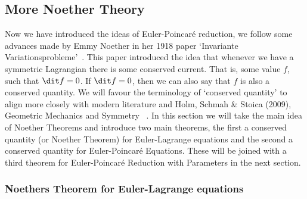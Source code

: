 
\subsection{More Noether Theory}
Now we have introduced the ideas of Euler-Poincar\'e reduction, we follow some advances made by Emmy Noether in her 1918 paper `Invariante Variationsprobleme'~\cite{Noether1918}. This paper introduced the idea that whenever we have a symmetric Lagrangian there is some conserved current. That is, some value $f$, such that $\dit f = 0$. If $\dit f = 0$, then we can also say that $f$ is also a conserved quantity. We will favour the terminology of `conserved quantity' to align more closely with modern literature and Holm, Schmah \& Stoica (2009), Geometric Mechanics and Symmetry ~\cite{holm_schmah_stoica_2009}. In this section we will take the main idea of Noether Theorems and introduce two main theorems, the first a conserved quantity (or Noether Theorem) for Euler-Lagrange equations and the second a conserved quantity for Euler-Poincar\'e Equations. These will be joined with a third theorem for Euler-Poincar\'e Reduction with Parameters in the next section.
\subsubsection{Noethers Theorem for Euler-Lagrange equations}

